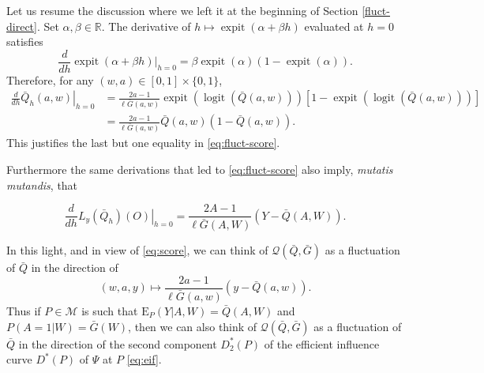 \documentclass[11pt,openright,twoside]{book}
\DeclareMathOperator{\expit}{expit}
\DeclareMathOperator{\logit}{logit}
\newcommand{\bbR}{\mathbb{R}}
\newcommand{\calM}{\mathcal{M}}
\newcommand{\calQ}{\mathcal{Q}}
\newcommand{\Exp}{\textrm{E}}
\newcommand{\Gbar}{\bar{G}}
\newcommand{\Qbar}{\bar{Q}}
\theoremstyle{definition}
\theoremstyle{definition}
\theoremstyle{definition}
\theoremstyle{remark}
\begin{document}
Let us resume the discussion where we left it at the beginning of Section
\ref{fluct-direct}. Set \(\alpha, \beta \in \bbR\). The derivative of \(h \mapsto \expit(\alpha + \beta h)\) evaluated at \(h=0\) satisfies
\begin{equation*}\frac{d}{dh}  \left.\expit(\alpha +  \beta h)\right|_{h=0}  =
\beta \expit(\alpha)  (1 - \expit(\alpha)).\end{equation*} Therefore, for any
\((w,a) \in [0,1] \times \{0,1\}\),
\begin{align*}\frac{d}{dh} \left.\Qbar_{h} (a, w)\right|_{h=0} &= \frac{2a - 1}{\ell\Gbar(a,w)} \expit\left(\logit\left(\Qbar(a,w)\right)\right) \left[1 - \expit\left(\logit\left(\Qbar(a,w)\right)\right)\right]\\&= \frac{2a - 1}{\ell\Gbar(a,w)} \Qbar(a,w) \left(1 - \Qbar(a,w)\right).\end{align*}
This justifies the last but one equality in \eqref{eq:fluct-score}.

Furthermore the same derivations that led to \eqref{eq:fluct-score} also imply,
\emph{mutatis mutandis}, that

\begin{equation*}  \frac{d}{d  h} \left.   L_{y}(\Qbar_{h})(O)\right|_{h=0}  =
\frac{2A      -      1}{\ell\Gbar(A,      W)}     \left(Y      -      \Qbar(A,
W)\right). \label{eq:fluct-score-bis}\end{equation*}

In this light, and in view of \eqref{eq:score}, we can think of \(\calQ(\Qbar, \Gbar)\) as a fluctuation of \(\Qbar\) in the direction of \begin{equation*}(w,a,y)     \mapsto    \frac{2a-1}{\ell\Gbar(a,w)}     (y     -
\Qbar(a,w)).\end{equation*} Thus if \(P \in \calM\) is such that
\(\Exp_{P}(Y|A,W) = \Qbar(A,W)\) and \(P(A=1|W) = \Gbar(W)\), then we can also
think of \(\calQ(\Qbar, \Gbar)\) as a fluctuation of \(\Qbar\) in the direction of
the second component \(D_{2}^{*}(P)\) of the efficient influence curve
\(D^{*}(P)\) of \(\Psi\) at \(P\) \eqref{eq:eif}.



\printindex
\end{document}
